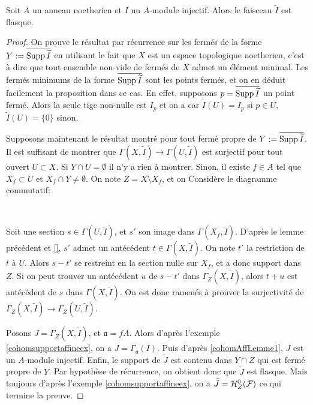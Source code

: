 \begin{prop}\label{cohomAffProp1}
Soit $A$ un anneau noetherien et $I$ un $A$-module injectif. Alors le faisceau $\widetilde{I}$ est flasque.
\end{prop}
\begin{proof}
On prouve le résultat par récurrence sur les fermés de la forme $Y:=\overline{\operatorname{Supp} \widetilde{I}}$ en utilisant le fait que $X$ est un espace topologique noetherien, c'est à dire que tout ensemble non-vide de fermés de $X$ admet un élément minimal. Les fermés minimums de la forme $\overline{\operatorname{Supp} \widetilde{I}}$ sont les points fermés, et on en déduit facilement la proposition dans ce cas. En effet, supposons $p=\overline{\operatorname{Supp} \widetilde{I}}$ un point fermé. Alors la seule tige non-nulle est $I_p$ et on a car $\widetilde{I}(U)=I_p$ si $p\in U$, $\widetilde{I}(U)=\lbrace 0 \rbrace$ sinon.

Supposons maintenant le résultat montré pour tout fermé propre de $Y:=\overline{\operatorname{Supp} \widetilde{I}}$. Il est suffisant de montrer que $\Gamma(X,\widetilde{I})\rightarrow\Gamma(U,\widetilde{I})$ est surjectif pour tout ouvert $U\subset X$. Si $Y\cap U=\emptyset$ il n'y a rien à montrer. Sinon, il existe $f\in A$ tel que $X_f\subset U$ et $X_f\cap Y\neq \emptyset$. On note $Z= X\setminus X_f$, et on Considère le diagramme commutatif:

	\begin{center}
	\\
	\end{center}
Soit une section $s\in\Gamma(U,\widetilde{I})$, et $s'$ son image dans $\Gamma(X_f,\widetilde{I})$. D'après le lemme précédent et \ref{}, $s'$ admet un antécédent $t\in \Gamma(X,\widetilde{I})$. On note $t'$ la restriction de $t$ à $U$. Alors $s-t'$ se restreint en la section nulle sur $X_f$, et a donc support dans $Z$. Si on peut trouver un antécédent $u$ de $s-t'$ dans $\Gamma_Z(X,\widetilde{I})$, alors $t+u$ est antécédent de $s$ dans $\Gamma(X,\widetilde{I})$. On est donc ramenés à prouver la surjectivité de $\Gamma_Z(X,\widetilde{I})\rightarrow\Gamma_Z(U,\widetilde{I})$.

Posons $J=\Gamma_Z(X,\widetilde{I})$, et $\mathfrak{a}=fA$. Alors d'après l'exemple \ref{cohomsupportaffineex}, on a $J=\Gamma_\mathfrak{a}(I)$. Puis d'après \ref{cohomAffLemme1}, $J$ est un $A$-module injectif. Enfin, le support de $\widetilde{J}$ est contenu dans $Y\cap Z$ qui est fermé propre de $Y$. Par hypothèse de récurrence, on obtient donc que $\widetilde{J}$ est flasque. Mais toujours d'après l'exemple \ref{cohomsupportaffineex}, on a $\widetilde{J} = \mathcal{H} ^0 _Z(\mathcal{F})$ ce qui termine la preuve.
\end{proof}


